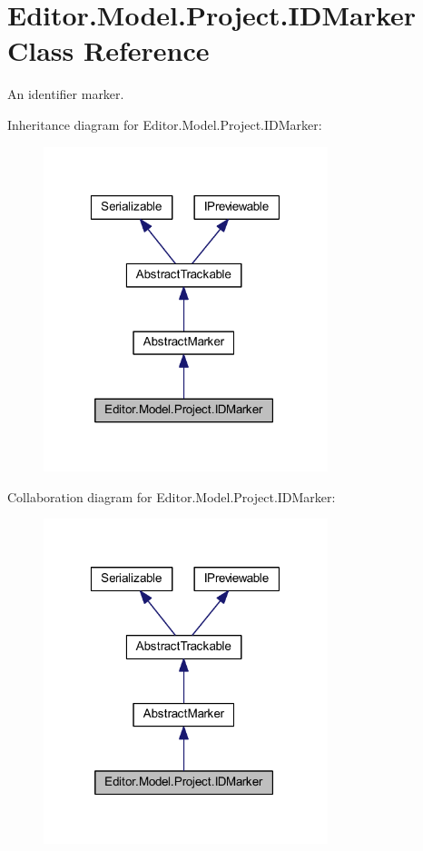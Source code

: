 \section{Editor.\-Model.\-Project.\-I\-D\-Marker Class Reference}
\label{class_editor_1_1_model_1_1_project_1_1_i_d_marker}


An identifier marker.  




Inheritance diagram for Editor.\-Model.\-Project.\-I\-D\-Marker\-:
\nopagebreak
\begin{figure}[H]
\begin{center}
\leavevmode
\includegraphics[width=235pt]{class_editor_1_1_model_1_1_project_1_1_i_d_marker__inherit__graph}
\end{center}
\end{figure}


Collaboration diagram for Editor.\-Model.\-Project.\-I\-D\-Marker\-:
\nopagebreak
\begin{figure}[H]
\begin{center}
\leavevmode
\includegraphics[width=235pt]{class_editor_1_1_model_1_1_project_1_1_i_d_marker__coll__graph}
\end{center}
\end{figure}
